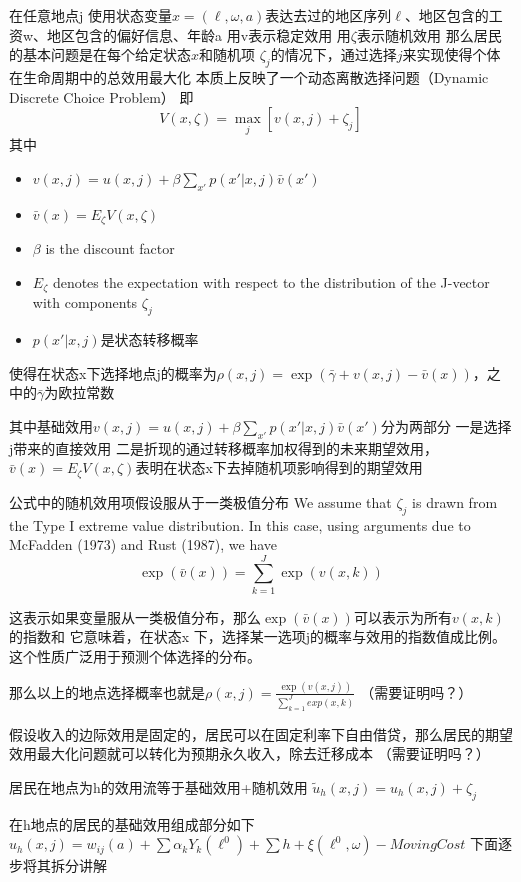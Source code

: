 \documentclass{article}
\numberwithin{equation}{section} %
\begin{document}
在任意地点j
使用状态变量$x=(\ell,\omega,a)$表达去过的地区序列$\ell$、地区包含的工资w、地区包含的偏好信息、年龄a
用v表示稳定效用
用$\zeta$表示随机效用
那么居民的基本问题是在每个给定状态$x$和随机项 $\zeta_j$的情况下，通过选择$j$来实现使得个体在生命周期中的总效用最大化
本质上反映了一个动态离散选择问题（Dynamic Discrete Choice Problem）
即
\begin{equation}
V(x,\zeta)=\max\limits_{j}[v(x,j)+\zeta_{j}]
\end{equation}
其中
\begin{itemize}
\item $v(x, j) = u(x, j) + \beta \sum_{x'} p(x' | x, j) \bar{v}(x')$
\item $\bar{v}(x) = E_{\zeta} V(x, \zeta)$
\item $\beta$ is the discount factor
\item $E_{\zeta}$ denotes the expectation with respect to the distribution of the J-vector with components $\zeta_{j}$
\item $p(x'|x,j)$是状态转移概率
\end{itemize}

使得在状态x下选择地点j的概率为$\rho(x,j)=\exp(\bar \gamma+v(x,j)-\bar v(x))$，之中的$\bar \gamma$为欧拉常数

其中基础效用$v(x, j) = u(x, j) + \beta \sum_{x'} p(x' | x, j) \bar{v}(x')$分为两部分
一是选择j带来的直接效用
二是折现的通过转移概率加权得到的未来期望效用，$\bar{v}(x) = E_{\zeta} V(x, \zeta)$表明在状态x下去掉随机项影响得到的期望效用

公式中的随机效用项假设服从于一类极值分布
We assume that $\zeta_j$ is drawn from the Type I extreme value distribution. In this case, using arguments due to McFadden (1973) and Rust (1987), we have
$$\exp\left(\bar{v}(x)\right) = \sum_{k=1}^J \exp\left(v(x, k)\right)$$

这表示如果变量服从一类极值分布，那么$\exp\left(\bar{v}(x)\right)$可以表示为所有$v(x, k)$的指数和
它意味着，在状态x 下，选择某一选项j的概率与效用的指数值成比例。
这个性质广泛用于预测个体选择的分布。

那么以上的地点选择概率也就是$\rho(x,j)=\frac{\exp(v(x,j))}{\sum\limits_{k=1}^{J} exp(x,k)}$
（需要证明吗？）

假设收入的边际效用是固定的，居民可以在固定利率下自由借贷，那么居民的期望效用最大化问题就可以转化为预期永久收入，除去迁移成本
（需要证明吗？）

居民在地点为h的效用流等于基础效用+随机效用
$\tilde u_{h}(x,j)=u_{h}(x,j) +\zeta_j$

在h地点的居民的基础效用组成部分如下
$u_h(x,j)=w_{ij}(a)+\sum\limits \alpha_{k}Y_{k}(\ell^{0})+\sum\limits h +\xi(\ell^{0},\omega)-MovingCost$
下面逐步将其拆分讲解
\end{document}
